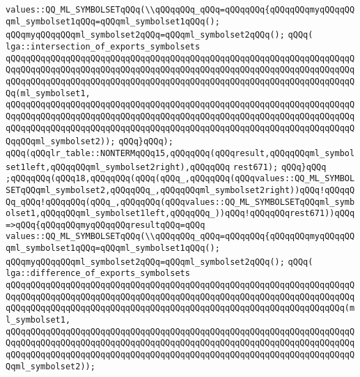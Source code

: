 \verb|values::QQ_ML_SYMBOLSETqQQq(\\qQQqqQQq_qQQq=qQQqqQQq{qQQqqQQqmyqQQqqQQqml_symbolset1qQQq=qQQqml_symbolset1qQQq();|\newline
\verb|qQQqmyqQQqqQQqml_symbolset2qQQq=qQQqml_symbolset2qQQq();|\newline
\verb|qQQq(|\newline
\verb|lga::intersection_of_exports_symbolsets|\newline
\verb|qQQqqQQqqQQqqQQqqQQqqQQqqQQqqQQqqQQqqQQqqQQqqQQqqQQqqQQqqQQqqQQqqQQqqQQqqQQqqQQqqQQqqQQqqQQqqQQqqQQqqQQqqQQqqQQqqQQqqQQqqQQqqQQqqQQqqQQqqQQqqQQqqQQqqQQqqQQqqQQqqQQqqQQqqQQqqQQqqQQqqQQqqQQqqQQqqQQqqQQqqQQqqQQqqQQq(ml_symbolset1,|\newline
\verb|qQQqqQQqqQQqqQQqqQQqqQQqqQQqqQQqqQQqqQQqqQQqqQQqqQQqqQQqqQQqqQQqqQQqqQQqqQQqqQQqqQQqqQQqqQQqqQQqqQQqqQQqqQQqqQQqqQQqqQQqqQQqqQQqqQQqqQQqqQQqqQQqqQQqqQQqqQQqqQQqqQQqqQQqqQQqqQQqqQQqqQQqqQQqqQQqqQQqqQQqqQQqqQQqqQQqqQQqml_symbolset2));|\newline
\verb|qQQq}qQQq);|\newline
\verb|qQQq(qQQqlr_table::NONTERMqQQq15,qQQqqQQq(qQQqresult,qQQqqQQqml_symbolset1left,qQQqqQQqml_symbolset2right),qQQqqQQq|\newline
\verb|rest671);|\newline
\verb|qQQq}qQQq|\newline
\verb|;qQQqqQQq(qQQq18,qQQqqQQq(qQQq(qQQq_,qQQqqQQq(qQQqvalues::QQ_ML_SYMBOLSETqQQqml_symbolset2,qQQqqQQq_,qQQqqQQqml_symbolset2right))qQQq!qQQqqQQq_qQQq!qQQqqQQq(qQQq_,qQQqqQQq(qQQqvalues::QQ_ML_SYMBOLSETqQQqml_symbolset1,qQQqqQQqml_symbolset1left,qQQqqQQq_))qQQq!qQQqqQQqrest671))qQQq=>qQQq{qQQqqQQqmyqQQqqQQqresultqQQq=qQQq|\newline
\verb|values::QQ_ML_SYMBOLSETqQQq(\\qQQqqQQq_qQQq=qQQqqQQq{qQQqqQQqmyqQQqqQQqml_symbolset1qQQq=qQQqml_symbolset1qQQq();|\newline
\verb|qQQqmyqQQqqQQqml_symbolset2qQQq=qQQqml_symbolset2qQQq();|\newline
\verb|qQQq(|\newline
\verb|lga::difference_of_exports_symbolsets|\newline
\verb|qQQqqQQqqQQqqQQqqQQqqQQqqQQqqQQqqQQqqQQqqQQqqQQqqQQqqQQqqQQqqQQqqQQqqQQqqQQqqQQqqQQqqQQqqQQqqQQqqQQqqQQqqQQqqQQqqQQqqQQqqQQqqQQqqQQqqQQqqQQqqQQqqQQqqQQqqQQqqQQqqQQqqQQqqQQqqQQqqQQqqQQqqQQqqQQqqQQqqQQqqQQqqQQq(ml_symbolset1,|\newline
\verb|qQQqqQQqqQQqqQQqqQQqqQQqqQQqqQQqqQQqqQQqqQQqqQQqqQQqqQQqqQQqqQQqqQQqqQQqqQQqqQQqqQQqqQQqqQQqqQQqqQQqqQQqqQQqqQQqqQQqqQQqqQQqqQQqqQQqqQQqqQQqqQQqqQQqqQQqqQQqqQQqqQQqqQQqqQQqqQQqqQQqqQQqqQQqqQQqqQQqqQQqqQQqqQQqqQQqml_symbolset2));|\newline
